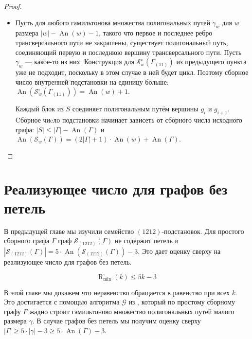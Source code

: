 \documentclass{article}
\theoremstyle{definition}
\newcommand{\An}{\operatorname{An}}
\newcommand{\G}{\mathcal{G}}
\newcommand{\Romin}{\operatorname{R}_{\min}^\circ}
\begin{document}
\begin{proof}
\begin{itemize}
        Построим гамильтоново множество полигональных путей $\gamma$ для $\mathcal{S}_w(\Gamma)$ следующим образом.
        \begin{itemize}
            \item Покраска $w^i$ индуцирована множеством $E(\gamma_w)$.
            \item Красим $e_r^i$ и $e_l^{i + 1}$ для всех нечётных $i$.
        \end{itemize}
        Для каждого нечётного $i$ блок находится в $S$. Такое $\gamma$ имеет минимальный возможный размер: $\An(\mathcal{S}_w(\Gamma)) = (2|\Gamma| + 1) \cdot \An(w)$.
        \item Пусть для любого гамильтонова множества полигональных путей $\gamma_w$ для $w$ размера $|w| - \An(w) - 1$, такого что первое и последнее ребро трансверсального пути не закрашены, существует полигональный путь, соединяющий первую и последнюю вершину трансверсального пути. Пусть $\gamma_w$ — какое-то из них. Конструкция для $\mathcal{S}_w^\circ(\Gamma_{(11)})$ из предыдущего пункта уже не подходит, поскольку в этом случае в ней будет цикл. Поэтому сборное число внутренней подстановки на единицу больше: $\An(\mathcal{S}_w^\circ(\Gamma_{(11)})) = \An(w) + 1$.

        Каждый блок из $S$ соединяет полигональным путём вершины $g_i$ и $g_{i + 1}$. Cборное чиcло подстановки начинает зависеть от сборного числа исходного графа:  $|S| \leq |\Gamma| - \An(\Gamma)$ и $\An(\mathcal{S}_w(\Gamma)) = (2|\Gamma| + 1) \cdot \An(w) + \An(\Gamma)$.
    \end{itemize}
\end{proof}


\section{Реализующее число для графов без петель}\label{sec:Romin}

В предыдущей главе мы изучили семейство $(1212)$-подстановок. Для простого сборного графа $\Gamma$ граф $\mathcal{S}_{(1212)}(\Gamma)$ не содержит петель и $|\mathcal{S}_{(1212)}(\Gamma)| = 5\cdot \An(\mathcal{S}_{(1212)}(\Gamma)) - 3$. Это дает оценку сверху на реализующее число для графов без петель.

\[
    \Romin(k) \leq 5k - 3
\]

В этой главе мы докажем что неравенство обращается в равенство при всех $k$.
Это достигается с помощью алгоритма $\G$ из \cite{MaksaevPreprint}, который по простому сборному графу $\Gamma$ жадно строит гамильтоново множество полигональных путей малого размера $\gamma$. В случае графов без петель мы получим оценку сверху $|\Gamma| \geq 5\cdot |\gamma| - 3 \geq 5 \cdot \An(\Gamma) - 3$.
\end{document}
